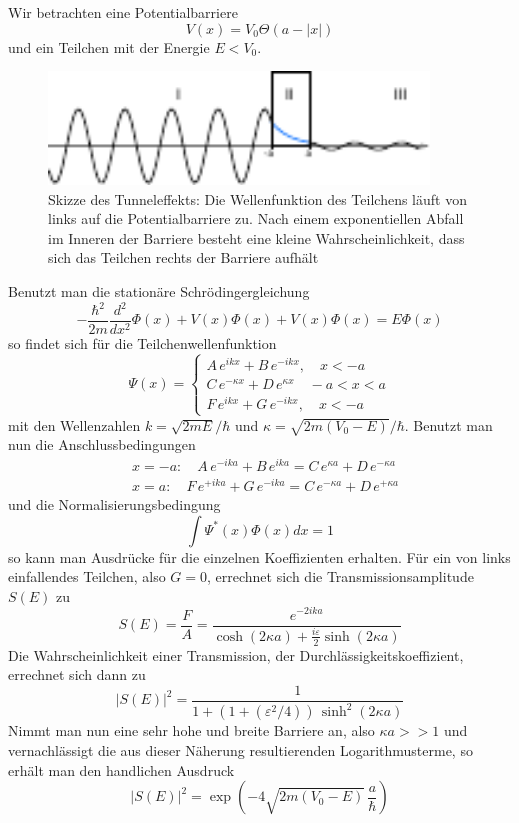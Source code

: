 Wir betrachten eine Potentialbarriere 
\[
    V(x) = V_0 \Theta ( a - |x| )    
\]
und ein Teilchen mit der Energie $E < V_0$.
\begin{figure}[h]
   \centering
   \includegraphics[width=0.9\textwidth]{Abb/tunnel.pdf}
   \caption{Skizze des Tunneleffekts: Die Wellenfunktion des Teilchens läuft von 
            links auf die Potentialbarriere zu. Nach einem exponentiellen Abfall
            im Inneren der Barriere besteht eine kleine Wahrscheinlichkeit, dass
            sich das Teilchen rechts der Barriere aufhält}
   \label{tunnel} 
\end{figure}
Benutzt man die stationäre Schrödingergleichung
\[
    - \frac{\hbar^2}{2m} \frac{d^2}{dx^2} \Phi(x) + V(x) \Phi(x) + V(x) \Phi(x)
    = E \Phi(x)    
\]
so findet sich für die Teilchenwellenfunktion
\[
    \Psi(x) = 
        \begin{cases}
            A \, e^{ikx} + B \, e^{-ikx}, \quad x<-a\\
            C \, e^{-\kappa x} + D \, e^{\kappa x} \quad -a < x < a\\
            F \, e^{ikx} + G \, e^{-ikx}, \quad x<-a
        \end{cases}
\]
mit den Wellenzahlen $k=\sqrt{2mE}/\hbar$ und $\kappa = \sqrt{2m(V_0-E)}/\hbar$.
Benutzt man nun die Anschlussbedingungen
\begin{align*}
    &x=-a: \quad A \, e^{-ika} + B \, e^{ika} = C \, e^{\kappa a} 
        + D \, e^{-\kappa a}\\
    &x=a: \quad F \, e^{+ika} + G \, e^{-ika} = C \, e^{-\kappa a} 
        + D \, e^{+\kappa a}
\end{align*}
und die Normalisierungsbedingung
\[
    \int \Psi^* (x) \Phi (x) dx = 1
\]
so kann man Ausdrücke für die einzelnen Koeffizienten erhalten. Für ein von links 
einfallendes Teilchen, also $G=0$, errechnet sich die Transmissionsamplitude 
$S(E)$ zu
\[
    S(E) = \frac{F}{A} = \frac{e^{-2ika}}{\cosh(2\kappa a) + \frac{i \varepsilon}{2}
                               \sinh(2\kappa a)}
\]
Die Wahrscheinlichkeit einer Transmission, der Durchlässigkeitskoeffizient, 
errechnet sich dann zu
\[
    | S(E) |^2 = \frac{1}{1+(1+(\varepsilon^2/4)) \, \sinh^2(2\kappa a)}
\]
Nimmt man nun eine sehr hohe und breite Barriere an, also $\kappa a >> 1$ und 
vernachlässigt die aus dieser Näherung resultierenden Logarithmusterme, so erhält
man den handlichen Ausdruck
\[
    | S(E) |^2 = \exp\left(-4 \sqrt{2m(V_0-E)} \, \frac{a}{\hbar}\right)
\]


